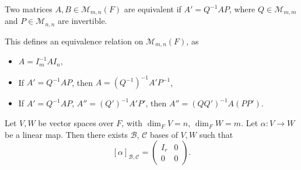 \documentclass[12pt]{article}
\begin{document}
\begin{definition}
	Two matrices $A, B \in \mathcal{M}_{m, n}(F)$ are equivalent if $A' = Q^{-1}AP$, where $Q \in \mathcal{M}_{m, m}$ and $P \in \mathcal{M}_{n, n}$ are invertible.
\end{definition}

\begin{remark}
	This defines an equivalence relation on $\mathcal{M}_{m, n}(F)$, as
	\begin{itemize}
		\item $A = I_m^{-1}AI_n$,
		\item If $A' = Q^{-1}AP$, then $A = (Q^{-1})^{-1}A' P^{-1}$,
		\item If $A' = Q^{-1}AP$, $A'' = (Q')^{-1}A'P'$, then $A'' = (QQ')^{-1}A(PP')$.
	\end{itemize}
	
\end{remark}

\begin{proposition}
	Let $V, W$ be vector spaces over $F$, with $\dim_F V = n$, $\dim_F W = m$. Let $\alpha : V \to W$ be a linear map. Then there exists $\mathcal{B}$, $\mathcal{C}$ bases of $V, W$ such that
	\[
		[\alpha]_{\mathcal{B}, \mathcal{C}} =
		\begin{pmatrix}
			I_r & 0 \\
			0 & 0
		\end{pmatrix}
	.\]
\end{proposition}
\end{document}
